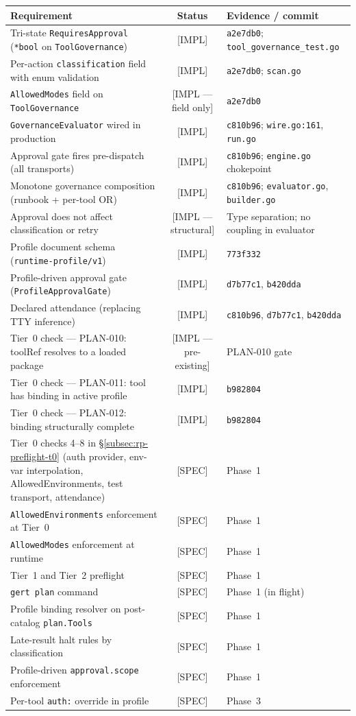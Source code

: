 \begin{center}
\begin{longtable}{p{7cm}cp{4cm}}
\toprule
\textbf{Requirement} & \textbf{Status} & \textbf{Evidence / commit} \\
\midrule
Tri-state \texttt{RequiresApproval} (\texttt{*bool} on
\texttt{ToolGovernance}) &
[IMPL] & \texttt{a2e7db0}; \texttt{tool\_governance\_test.go} \\
Per-action \texttt{classification} field with enum validation &
[IMPL] & \texttt{a2e7db0}; \texttt{scan.go} \\
\texttt{AllowedModes} field on \texttt{ToolGovernance} &
[IMPL — field only] & \texttt{a2e7db0} \\
\texttt{GovernanceEvaluator} wired in production &
[IMPL] & \texttt{c810b96}; \texttt{wire.go:161}, \texttt{run.go} \\
Approval gate fires pre-dispatch (all transports) &
[IMPL] & \texttt{c810b96}; \texttt{engine.go} chokepoint \\
Monotone governance composition (runbook + per-tool OR) &
[IMPL] & \texttt{c810b96}; \texttt{evaluator.go}, \texttt{builder.go} \\
Approval does not affect classification or retry &
[IMPL — structural] & Type separation; no coupling in evaluator \\
\midrule
Profile document schema (\texttt{runtime-profile/v1}) &
[IMPL] & \texttt{773f332} \\
Profile-driven approval gate (\texttt{ProfileApprovalGate}) &
[IMPL] & \texttt{d7b77c1}, \texttt{b420dda} \\
Declared attendance (replacing TTY inference) &
[IMPL] & \texttt{c810b96}, \texttt{d7b77c1}, \texttt{b420dda} \\
Tier~0 check — PLAN-010: toolRef resolves to a loaded package &
[IMPL — pre-existing] & PLAN-010 gate \\
Tier~0 check — PLAN-011: tool has binding in active profile &
[IMPL] & \texttt{b982804} \\
Tier~0 check — PLAN-012: binding structurally complete &
[IMPL] & \texttt{b982804} \\
Tier~0 checks 4–8 in \S\ref{subsec:rp-preflight-t0} (auth provider,
env-var interpolation, AllowedEnvironments, test transport, attendance) &
[SPEC] & Phase~1 \\
\texttt{AllowedEnvironments} enforcement at Tier~0 & [SPEC] & Phase~1 \\
\texttt{AllowedModes} enforcement at runtime & [SPEC] & Phase~1 \\
Tier~1 and Tier~2 preflight & [SPEC] & Phase~1 \\
\texttt{gert plan} command & [SPEC] & Phase~1 (in flight) \\
Profile binding resolver on post-catalog \texttt{plan.Tools} & [SPEC] & Phase~1 \\
Late-result halt rules by classification & [SPEC] & Phase~1 \\
Profile-driven \texttt{approval.scope} enforcement & [SPEC] & Phase~1 \\
Per-tool \texttt{auth:} override in profile & [SPEC] & Phase~3 \\
\bottomrule
\end{longtable}
\end{center}
